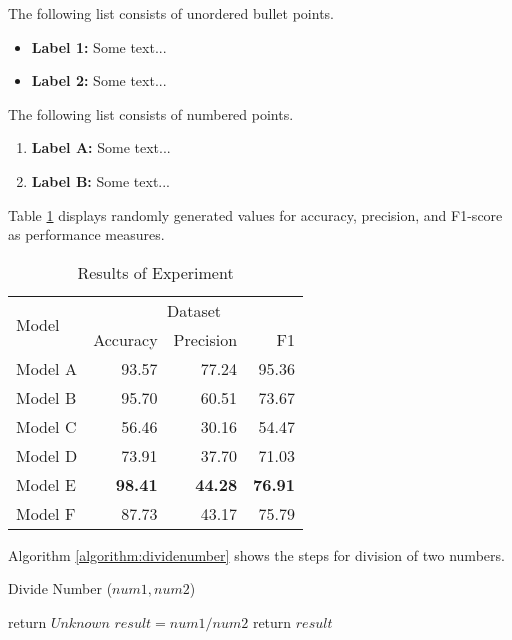 The following list consists of unordered bullet points.

\begin{itemize} \label{asd}
    \item \textbf{Label 1:} Some text...
    \item \textbf{Label 2:} Some text...
\end{itemize}

The following list consists of numbered points.

\begin{enumerate}
    \item \textbf{Label A:} Some text...
    \item \textbf{Label B:} Some text...
\end{enumerate}

Table \ref{table:results} displays randomly generated values for accuracy, precision, and F1-score as performance measures.

\begin{table}[H]
\centering
\caption{Results of Experiment}
\label{table:results}
\begin{tabularx}{0.8\linewidth}{@{ } X | *{3}{r} @{ }}
\toprule
\multirow{2}{*}{Model} & \multicolumn{3}{c}{Dataset} \\ 
        & Accuracy             & Precision              & F1      \\ 
\midrule
Model A & {93.57}  & {77.24}  & {95.36}           \\ 
Model B & {95.70}  & {60.51}  & {73.67}           \\ 
Model C & {56.46}  & {30.16}  & {54.47}           \\ 
Model D & {73.91}  & {37.70}  & {71.03}           \\ 
Model E & \textbf{98.41}  & \textbf{44.28}  & \textbf{76.91}  \\ 
Model F & {87.73}  & {43.17}  & {75.79}           \\
\bottomrule
\end{tabularx}
\end{table}

Algorithm \ref{algorithm:dividenumber} shows the steps for division of two numbers.

\begin{algorithm}[H]
\caption{ Divide Number ($num1, num2$)}
\label{algorithm:dividenumber}
\begin{algorithmic}[1]
    \State return $Unknown$
\EndIf
\State $result = num1 / num2$
\State return $result$
\end{algorithmic}
\end{algorithm}

